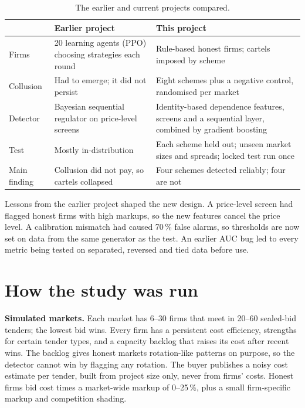 \documentclass[11pt,a4paper]{article}
\begin{document}
\begin{table}[H]
\centering
\small
\begin{tabular}{@{}p{2.6cm}p{5.6cm}p{5.6cm}@{}}
\toprule
& Earlier project & This project \\
\midrule
Firms & 20 learning agents (PPO) choosing strategies each round & Rule-based honest firms; cartels imposed by scheme \\
Collusion & Had to emerge; it did not persist & Eight schemes plus a negative control, randomised per market \\
Detector & Bayesian sequential regulator on price-level screens & Identity-based dependence features, screens and a sequential layer, combined by gradient boosting \\
Test & Mostly in-distribution & Each scheme held out; unseen market sizes and spreads; locked test run once \\
Main finding & Collusion did not pay, so cartels collapsed & Four schemes detected reliably; four are not \\
\bottomrule
\end{tabular}
\caption{The earlier and current projects compared.}
\end{table}

Lessons from the earlier project shaped the new design. A price-level screen had flagged honest firms with high markups, so the new features cancel the price level. A calibration mismatch had caused 70\,\% false alarms, so thresholds are now set on data from the same generator as the test. An earlier AUC bug led to every metric being tested on separated, reversed and tied data before use.

\section{How the study was run}

\textbf{Simulated markets.} Each market has 6--30 firms that meet in 20--60 sealed-bid tenders; the lowest bid wins. Every firm has a persistent cost efficiency, strengths for certain tender types, and a capacity backlog that raises its cost after recent wins. The backlog gives honest markets rotation-like patterns on purpose, so the detector cannot win by flagging any rotation. The buyer publishes a noisy cost estimate per tender, built from project size only, never from firms' costs. Honest firms bid cost times a market-wide markup of 0--25\,\%, plus a small firm-specific markup and competition shading.
\end{document}
